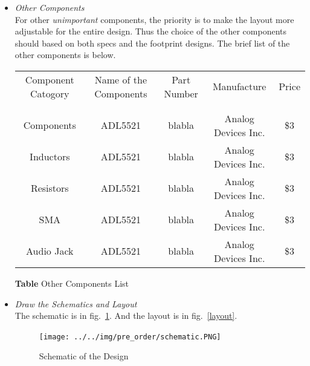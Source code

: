 \documentclass[]{article}
\begin{document}
\begin{itemize}
        \item \textit{Other Components} \\
            For other \textit{unimportant} components, the priority is to make
            the layout more adjustable for the entire design. Thus the choice of
            the other components should based on both specs and the footprint
            designs. The brief list of the other components is below.

            \begin{center}
                \begin{tabular}{c c c c c}
                    Component Catogory & Name of the Components & Part Number &
                    Manufacture & Price \\ \\ \hline \\
                    Components & ADL5521 & blabla & Analog Devices Inc.
                    & \$3 \\
                    Inductors & ADL5521 & blabla & Analog Devices Inc. & \$3 \\
                    Resistors & ADL5521 & blabla & Analog Devices Inc. & \$3
                    \\
                    SMA & ADL5521 & blabla & Analog Devices Inc. & \$3 \\
                    Audio Jack & ADL5521 & blabla & Analog Devices Inc. & \$3 \\
                \end{tabular}
            \end{center}

            \begin{center}
                \textbf{Table} Other Components List 
            \end{center}

        \item \textit{Draw the Schematics and Layout} \\
            The schematic is in fig.~\ref{schematic}. And the layout is in
            fig.~\ref{layout}.
            \begin{figure}[p]
                \begin{center}
                    \texttt{[image: ../../img/pre\_order/schematic.PNG]}~
                    \label{schematic}
                    \caption{Schematic of the Design}
                \end{center}
            \end{figure}


\end{itemize}
\end{document}
